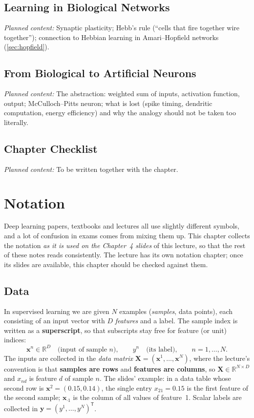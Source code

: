 \documentclass[11pt, oneside]{book}
\newcommand{\R}{\mathbb{R}}
\newcommand{\T}{^{\mathsf{T}}}           %
\newcommand{\bx}{\bm{x}}        \newcommand{\by}{\bm{y}}
\newcommand{\bX}{\bm{X}}        \newcommand{\bY}{\bm{Y}}
\newcommand{\planned}[1]{%
  \par{\small\color{gray!70!black}\textit{Planned content:} #1}\par}
\let\originalsection\section
\renewcommand{\section}{\Needspace{7\baselineskip}\originalsection}
\begin{document}
\section{Learning in Biological Networks}
\planned{Synaptic plasticity; Hebb's rule (``cells that fire together wire
together''); connection to Hebbian learning in Amari--Hopfield networks
(\cref{sec:hopfield}).}

\section{From Biological to Artificial Neurons}
\planned{The abstraction: weighted sum of inputs, activation function,
output; McCulloch--Pitts neuron; what is lost (spike timing, dendritic
computation, energy efficiency) and why the analogy should not be taken too
literally.}

\section{Chapter Checklist}
\planned{To be written together with the chapter.}


\chapter{Notation}
\label{ch:notation}

Deep learning papers, textbooks and lectures all use slightly different
symbols, and a lot of confusion in exams comes from mixing them up. This
chapter collects the notation \emph{as it is used on the Chapter~4 slides} of
this lecture, so that the rest of these notes reads consistently. The
lecture has its own notation chapter; once its slides are available, this
chapter should be checked against them.

\section{Data}
\label{sec:notation-data}

In supervised learning we are given $N$ examples (\emph{samples}, data
points), each consisting of an input vector with $D$ \emph{features} and a
label. The sample index is written as a \textbf{superscript}, so that
subscripts stay free for feature (or unit) indices:
\[
  \bx^n \in \R^D \quad\text{(input of sample } n\text{)}, \qquad
  y^n \quad\text{(its label)}, \qquad n = 1, \dots, N.
\]
The inputs are collected in the \emph{data matrix}
$\bX = (\bx^1, \dots, \bx^N)$, where the lecture's convention is that
\textbf{samples are rows} and \textbf{features are columns}, so
$\bX \in \R^{N \times D}$ and $x_{nd}$ is feature $d$ of sample $n$. The
slides' example: in a data table whose second row is $\bx^2 = (0.15, 0.14)$,
the single entry $x_{21} = 0.15$ is the first feature of the second sample;
$\bx_{\cdot 1}$ is the column of all values of feature~1. Scalar labels are
collected in $\by = (y^1, \dots, y^N)\T$.
\end{document}
